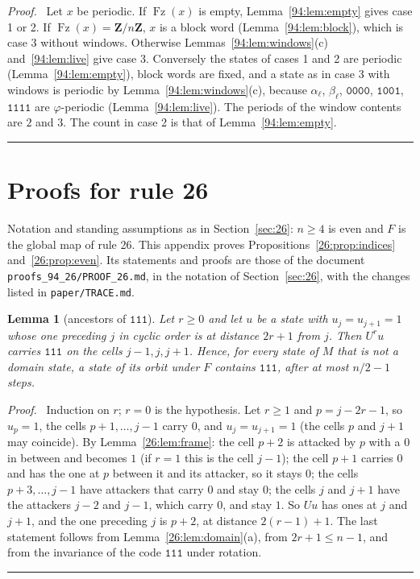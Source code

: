 \documentclass[10pt,a4paper]{article}
\newtheorem{lemma}[theorem]{Lemma}
\newcommand{\qedmark}{\rule{1.1ex}{1.1ex}}
\newenvironment{proof}[1][Proof]{\par\smallskip\noindent\textit{#1.}\ }{\hfill\qedmark\par\smallskip}
\newcommand{\Zn}{\mathbf{Z}/n\mathbf{Z}}      %
\newcommand{\code}[1]{\mathtt{#1}}            %
\newcommand{\Fz}{\operatorname{Fz}}           %
\begin{document}
\begin{proof}
Let $x$ be periodic. If $\Fz(x)$ is empty, Lemma~\ref{94:lem:empty} gives case 1 or 2. If $\Fz(x)=\Zn$, $x$ is a
block word (Lemma~\ref{94:lem:block}), which is case 3 without windows. Otherwise
Lemmas~\ref{94:lem:windows}(c) and~\ref{94:lem:live} give case 3. Conversely the states of cases 1 and 2 are
periodic (Lemma~\ref{94:lem:empty}), block words are fixed, and a state as in case 3 with windows is periodic by
Lemma~\ref{94:lem:windows}(c), because $\alpha_\ell$, $\beta_\ell$, $\code{0000}$, $\code{1001}$, $\code{1111}$
are $\varphi$-periodic (Lemma~\ref{94:lem:live}). The periods of the window contents are $2$ and $3$. The count
in case 2 is that of Lemma~\ref{94:lem:empty}.
\end{proof}

\section{Proofs for rule 26}\label{app:26}

Notation and standing assumptions as in Section~\ref{sec:26}: $n\ge4$ is even and $F$ is the global map of rule 26.
This appendix proves Propositions~\ref{26:prop:indices} and~\ref{26:prop:even}. Its statements and proofs are those
of the document \texttt{proofs\_94\_26/PROOF\_26.md}, in the notation of Section~\ref{sec:26}, with the changes listed
in \texttt{paper/TRACE.md}.

\begin{lemma}[ancestors of $\code{111}$]\label{26:lem:ancestors}
Let $r\ge0$ and let $u$ be a state with $u_j=u_{j+1}=1$ whose one preceding $j$ in cyclic order is at distance
$2r+1$ from $j$. Then $U^ru$ carries $\code{111}$ on the cells $j-1,j,j+1$. Hence, for every state of $M$ that is
not a domain state, a state of its orbit under $F$ contains $\code{111}$, after at most $n/2-1$ steps.
\end{lemma}
\begin{proof}
Induction on $r$; $r=0$ is the hypothesis. Let $r\ge1$ and $p=j-2r-1$, so $u_p=1$, the cells $p+1,\dots,j-1$ carry
$0$, and $u_j=u_{j+1}=1$ (the cells $p$ and $j+1$ may coincide). By Lemma~\ref{26:lem:frame}: the cell $p+2$ is
attacked by $p$ with a $0$ in between and becomes $1$ (if $r=1$ this is the cell $j-1$); the cell $p+1$ carries $0$
and has the one at $p$ between it and its attacker, so it stays $0$; the cells $p+3,\dots,j-1$ have attackers that
carry $0$ and stay $0$; the cells $j$ and $j+1$ have the attackers $j-2$ and $j-1$, which carry $0$, and stay $1$.
So $Uu$ has ones at $j$ and $j+1$, and the one preceding $j$ is $p+2$, at distance $2(r-1)+1$. The last statement
follows from Lemma~\ref{26:lem:domain}(a), from $2r+1\le n-1$, and from the invariance of the code $\code{111}$
under rotation.
\end{proof}
\end{document}

